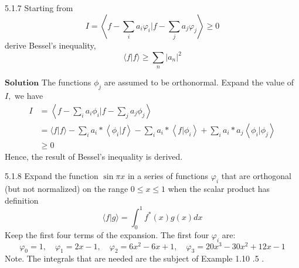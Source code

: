 \documentclass{article}
\begin{document}
\begin{flushleft}
$$$$


\begin{mybox}{5.1.7}
Starting from 
$$I=\left\langle f-\sum_{i} a_{i} \varphi_{i} | f-\sum_{j} a_{j} \varphi_{j}\right\rangle \geq 0$$
derive Bessel's inequality, 
$$\langle f | f\rangle \geq \sum_{n}\left|a_{n}\right|^{2}$$
\end{mybox}

$\boxed{\textbf{Solution}}$ The functions $\phi_{j}$ are assumed to be orthonormal.
Expand the value of $I,$ we have
$$\begin{aligned} I &=\left\langle f-\sum_{i} a_{i} \phi_{i} | f-\sum_{j} a_{j} \phi_{j}\right\rangle \\ &=\langle f | f\rangle-\sum_{i} a_{i} *\left\langle\phi_{i} | f\right\rangle-\sum_{i} a_{i} *\left\langle f | \phi_{i}\right\rangle+\sum_{i} a_{i} * a_{j}\left\langle\phi_{i} | \phi_{j}\right\rangle \\ & \geq 0 \end{aligned}$$
Hence, the result of Bessel's inequality is derived.

\newpage

\begin{mybox}{5.1.8}
Expand the function $\sin \pi x$ in a series of functions $\varphi_{i}$ that are orthogonal (but not normalized) on the range $0 \leq x \leq 1$ when the scalar product has definition
$$
\langle f | g\rangle=\int_{0}^{1} f^{*}(x) g(x) d x
$$
Keep the first four terms of the expansion. The first four $\varphi_{i}$ are:
$$
\varphi_{0}=1, \quad \varphi_{1}=2 x-1, \quad \varphi_{2}=6 x^{2}-6 x+1, \quad \varphi_{3}=20 x^{3}-30 x^{2}+12 x-1
$$
Note. The integrals that are needed are the subject of Example 1.10 .5 .
\end{mybox}


\end{flushleft}
\end{document}
